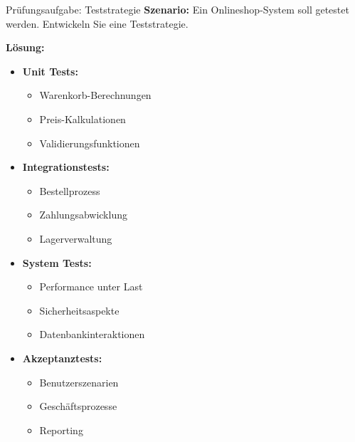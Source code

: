 \begin{example2}{Prüfungsaufgabe: Teststrategie}
\textbf{Szenario:}
Ein Onlineshop-System soll getestet werden. Entwickeln Sie eine Teststrategie.

\textbf{Lösung:}
\begin{itemize}
    \item \textbf{Unit Tests:}
    \begin{itemize}
        \item Warenkorb-Berechnungen
        \item Preis-Kalkulationen
        \item Validierungsfunktionen
    \end{itemize}
    
    \item \textbf{Integrationstests:}
    \begin{itemize}
        \item Bestellprozess
        \item Zahlungsabwicklung
        \item Lagerverwaltung
    \end{itemize}
    
    \item \textbf{System Tests:}
    \begin{itemize}
        \item Performance unter Last
        \item Sicherheitsaspekte
        \item Datenbankinteraktionen
    \end{itemize}
    
    \item \textbf{Akzeptanztests:}
    \begin{itemize}
        \item Benutzerszenarien
        \item Geschäftsprozesse
        \item Reporting
    \end{itemize}
\end{itemize}
\end{example2}

